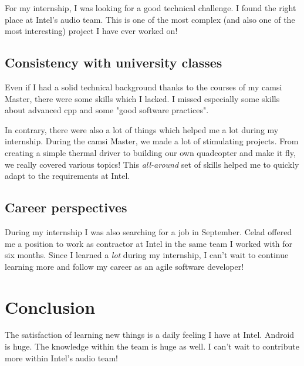 For my internship, I was looking for a good technical challenge. I found the right place
at Intel's audio team.
This is one of the most complex (and also one of the most
interesting) project I have ever worked on!

\subsection{Consistency with university classes}
Even if I had a solid technical background thanks to the courses of my
\gls{camsi} Master, there were some skills which I lacked.
I missed especially some skills about advanced \gls{cpp} and some "good software practices".

In contrary, there were also a lot of things which helped me a lot during
my internship.  During the \gls{camsi} Master, we made a lot of stimulating
projects. From creating a simple thermal driver to building our own quadcopter
and make it fly, we really covered various topics! This \emph{all-around} set of
skills helped me to quickly adapt to the requirements at Intel.

\subsection{Career perspectives}
During my internship I was also searching for a job in September. Celad offered me a position to work
as contractor at Intel in the same team I worked with for six months.
Since I learned a \emph{lot} during my internship, I can't wait to continue learning more and follow my career
as an agile software developer!

\section{Conclusion}
The satisfaction of learning new things is a daily feeling I have at
Intel. Android is huge. The knowledge within the team is huge as well. I can't
wait to contribute more within Intel's audio team!
